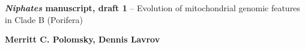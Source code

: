 \documentclass[../main.tex]{subfiles}
\begin{document}
\begin{titlepage}
   \begin{center}
       \vspace*{1cm}
        \huge
       \textbf{\emph{Niphates} manuscript, draft 1} -- Evolution of mitochondrial genomic features in Clade B (Porifera)
       \vspace{2.0cm}
       
       \large
       \textbf{Merritt C. Polomsky, Dennis Lavrov}
       \vfill
       \vspace{0.8cm}
   \end{center}
\end{titlepage}
\end{document}
